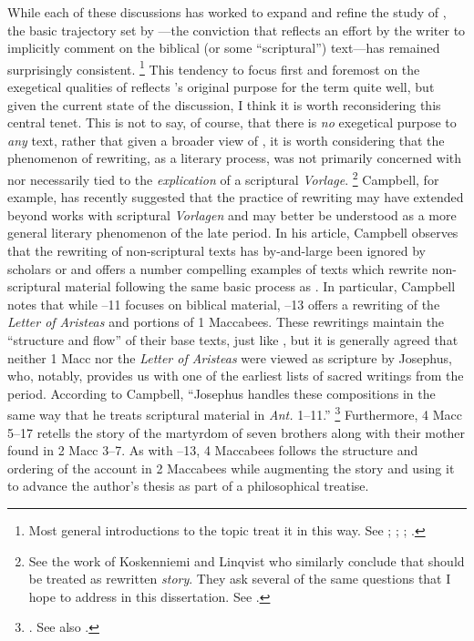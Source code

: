 While each of these discussions has worked to expand and refine the study of \rwb, the basic trajectory set by \vermes---the conviction that \rwb reflects an effort by the writer to implicitly comment on the biblical (or some ``scriptural'') text---has remained surprisingly consistent.%
    \footnote{Most general introductions to the topic treat it in this way. See
        \cite{crawford_charlesworth2000};
        \cite{brooke_schiffman-vanderkam2000};
        \cite{zahn_lim-collins2010};
        \cite{zahn2011}.}
%
This tendency to focus first and foremost on the exegetical qualities of \rwb reflects \vermes's original purpose for the term quite well, but given the current state of the discussion, I think it is worth reconsidering this central tenet. This is not to say, of course, that there is \emph{no} exegetical purpose to \emph{any} \rwb text, rather that given a broader view of \rwb, it is worth considering that the phenomenon of rewriting, as a literary process, was not primarily concerned with nor necessarily tied to the \emph{explication} of a scriptural \emph{Vorlage}.%
    \footnote{See the work of Koskenniemi and Linqvist who similarly conclude that \rwb should be treated as rewritten \emph{story}. They ask several of the same questions that I hope to address in this dissertation. See \cite{koskenniemi-lindqvist_laato-ruiten2008}.}
%
Campbell, for example, has recently suggested that the practice of rewriting may have extended beyond works with scriptural \emph{Vorlagen} and may better be understood as a more general literary phenomenon of the late \secondtemple period.%
    \autocite{campbell_zsengeller2014} 
In his article, Campbell observes that the rewriting of non-scriptural texts has by-and-large been ignored by scholars or \rwb and offers a number compelling examples of \secondtemple texts which rewrite non-scriptural material following the same basic process as \rwb. In particular, Campbell notes that while --11 focuses on biblical material, --13 offers a rewriting of the \emph{Letter of Aristeas} and portions of 1 Maccabees. These rewritings maintain the ``structure and flow'' of their base texts, just like \rwb, but it is generally agreed that neither 1 Macc nor the \emph{Letter of Aristeas} were viewed as scripture by Josephus, who, notably, provides us with one of the earliest lists of sacred writings from the period.%
    \autocite{mason2002_mcdonald-sanders2002}
According to Campbell, ``Josephus handles these compositions in the same way that he treats scriptural material in \emph{Ant.} 1--11.''%
    \footnote{%
        \cite[70]{campbell_zsengeller2014}. See also
        \cite[126]{mason2002_mcdonald-sanders2002}.}
Furthermore, 4 Macc 5--17 retells the story of the martyrdom of seven brothers along with their mother found in 2 Macc 3--7. As with --13, 4 Maccabees follows the structure and ordering of the account in 2 Maccabees while augmenting the story and using it to advance the author's thesis as part of a philosophical treatise. 

